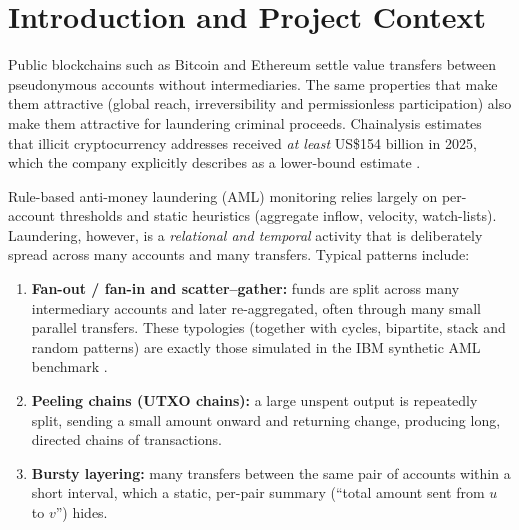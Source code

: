 \documentclass[11pt,a4paper]{article}
\begin{document}
\newpage
\tableofcontents
\newpage
\listoffigures
\listoftables
\newpage

\section{Introduction and Project Context}
\label{sec:intro}

Public blockchains such as Bitcoin and Ethereum settle value transfers between pseudonymous accounts without intermediaries. The same properties that make them attractive (global reach, irreversibility and permissionless participation) also make them attractive for laundering criminal proceeds. Chainalysis estimates that illicit cryptocurrency addresses received \emph{at least} US\$154 billion in 2025, which the company explicitly describes as a lower-bound estimate \cite{chainalysis2026crime}.

Rule-based anti-money laundering (AML) monitoring relies largely on per-account thresholds and static heuristics (aggregate inflow, velocity, watch-lists). Laundering, however, is a \emph{relational and temporal} activity that is deliberately spread across many accounts and many transfers. Typical patterns include:
\begin{enumerate}[leftmargin=*]
    \item \textbf{Fan-out / fan-in and scatter--gather:} funds are split across many intermediary accounts and later re-aggregated, often through many small parallel transfers. These typologies (together with cycles, bipartite, stack and random patterns) are exactly those simulated in the IBM synthetic AML benchmark \cite{altman2023ibmaml}.
    \item \textbf{Peeling chains (UTXO chains):} a large unspent output is repeatedly split, sending a small amount onward and returning change, producing long, directed chains of transactions.
    \item \textbf{Bursty layering:} many transfers between the same pair of accounts within a short interval, which a static, per-pair summary (``total amount sent from $u$ to $v$'') hides.
\end{enumerate}
\end{document}
